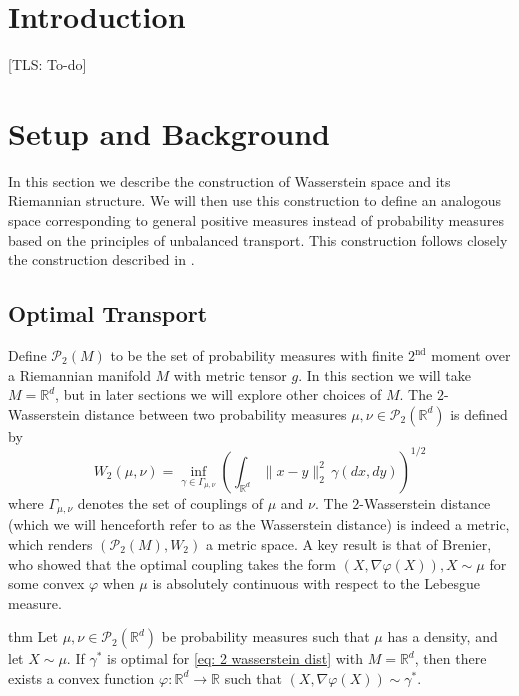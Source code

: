 \documentclass[11pt]{article}
\newcommand{\man}{M}
\newcommand{\tls}[1]{{\color{cyan}[TLS: #1]}}
\begin{document}
\tableofcontents

\section{Introduction}
\tls{To-do}


\section{Setup and Background}

In this section we describe the construction of Wasserstein space and its Riemannian structure.  We will then use this construction to define an analogous space corresponding to general positive measures instead of probability measures based on the principles of unbalanced transport. This construction follows closely the construction described in \cite{clancy2021interpolating, chewi2024statisticaloptimaltransport, liero2018optimal, liero2016optimal, chizat2018interpolating, kondratyev2016newoptimaltransportdistance}.  

\subsection{Optimal Transport} Define $\mathcal{P}_{2}(\man)$ to be the set of probability measures with finite $2^{\text{nd}}$ moment over a Riemannian manifold $\man$ with metric tensor $g$. In this section we will take $M =\mathbb{R}^d$, but in later sections we will explore other choices of $M$. The $2$-Wasserstein distance between two probability measures $\mu, \nu \in \mathcal{P}_{2}(\mathbb{R}^d)$ is defined by
\begin{equation}
    W_2(\mu, \nu) = \inf_{\gamma \in \Gamma_{\mu, \nu}}\left(\int_{\mathbb{R}^d} \|x-y\|_2^2\,\gamma(dx, dy)\right)^{1/2} \label{eq: 2 wasserstein dist}
\end{equation}
where $\Gamma_{\mu, \nu}$ denotes the set of couplings of $\mu$ and $\nu$. The $2$-Wasserstein distance (which we will henceforth refer to as the Wasserstein distance) is indeed a metric, which renders $(\mathcal{P}_{2}(\man), W_2)$ a metric space. A key result is that of Brenier, who showed that the optimal coupling takes the form $(X, \nabla \varphi(X)), X \sim \mu$ for some convex $\varphi$ when $\mu$ is absolutely continuous with respect to the Lebesgue measure.

\begin{restatable}[Brenier]{thm}{}
    Let $\mu, \nu \in \mathcal{P}_2(\mathbb{R}^d)$ be probability measures such that $\mu$ has a density, and let $X \sim \mu$. If $\gamma^*$ is optimal for \cref{eq: 2 wasserstein dist} with $\man = \mathbb{R}^d$, then there exists a convex function $\varphi:\mathbb{R}^d \rightarrow \mathbb{R}$ such that $(X, \nabla\varphi(X))\sim \gamma^*$. 
\end{restatable}
\end{document}
